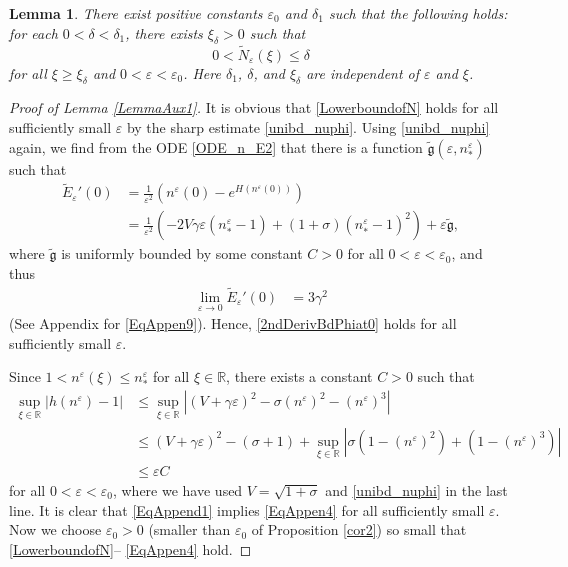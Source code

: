 \documentclass{amsart}
\newcommand{\veps}{\varepsilon}
\numberwithin{equation}{section}
\theoremstyle{plain}%
\newtheorem{lemma}[theorem]{Lemma}
\theoremstyle{definition}
\theoremstyle{remark}
\theoremstyle{remark}
\begin{document}
\begin{lemma}\label{LemmaAux3}
There exist positive constants $\veps_0$ and $\delta_1$  such that the following holds: for each $0 < \delta < \delta_1$, there exists $\xi_\delta>0$ such that
\[
0<\widetilde{N}_\veps(\xi) \leq \delta 
\]
  for all $\xi \geq \xi_\delta$ and $0<\veps<\veps_0$. Here $\delta_1$, $\delta$, and $\xi_\delta$ are independent of $\veps$ and $\xi$.
\end{lemma}

\begin{proof}[Proof of Lemma \ref{LemmaAux1}]
It is obvious that \eqref{LowerboundofN} holds for all sufficiently small $\veps$ by the sharp estimate \eqref{unibd_nuphi}. Using \eqref{unibd_nuphi} again, we find from the ODE  \eqref{ODE_n_E2} that there is a function $\tilde{\mathfrak{g}}(\veps,n_\ast^\veps)$ such that
\begin{equation}\label{EqAppen9}
\begin{split}
\widetilde{E}_\veps'(0) 
& = \frac{1}{\veps^2}\left( n^\veps(0)-e^{H(n^\veps(0))}\right) \\
& = \frac{1}{\veps^2}\left( -2V\gamma\veps(n_\ast^\veps-1) + (1+\sigma)(n_\ast^\veps-1)^2 \right) + \veps\tilde{\mathfrak{g}},
\end{split}
\end{equation}
where $\tilde{\mathfrak{g}}$ is uniformly bounded by some constant $C>0$ for all $0<\veps<\veps_0$, and thus
\[
\begin{split}
\lim_{\veps \to 0}\widetilde{E}_\veps'(0) 
& =  3\gamma^2
\end{split}
\]
(See Appendix for \eqref{EqAppen9}). 
Hence, \eqref{2ndDerivBdPhiat0} holds for all sufficiently small $\veps$. 

Since $1<n^\veps(\xi)  \leq n_\ast^\veps$ for all $\xi \in \mathbb{R}$, there exists a constant $C>0$ such that 
\begin{equation}\label{EqAppend1}
\begin{split}
\sup_{\xi \in \mathbb{R}}\left| h(n^\veps) -1 \right| 
& \leq \sup_{\xi \in \mathbb{R}}\left|(V+\gamma\veps)^2-\sigma (n^\veps)^2-(n^\veps)^3 \right| \\
& \leq (V+\gamma\veps)^2-(\sigma+1) +  \sup_{\xi \in \mathbb{R}}\left| \sigma\left(1-(n^\veps)^2\right)+\left(1-( n^\veps)^3 \right) \right|  \\
& \leq \veps C
\end{split}
\end{equation}
for all $0<\veps<\veps_0$, where we have used $V=\sqrt{1+\sigma}$ and \eqref{unibd_nuphi} in the last line. It is clear that \eqref{EqAppend1} implies \eqref{EqAppen4} for all sufficiently small $\veps$. Now we choose $\veps_0>0$ (smaller than $\veps_0$ of Proposition \ref{cor2}) so small that \eqref{LowerboundofN}-- \eqref{EqAppen4} hold.


\end{proof}
\end{document}
